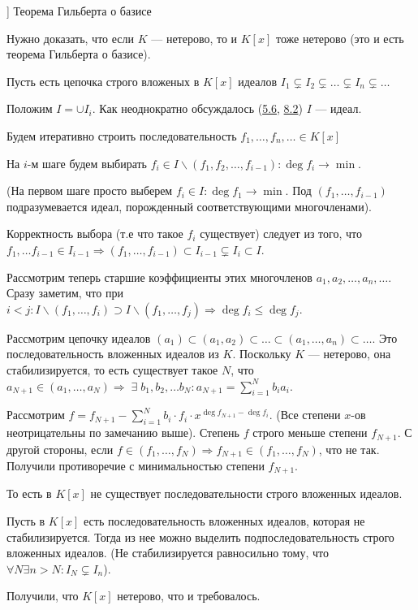 

\date{}



\begin{problem}[10 [Каргальцев]]
Теорема Гильберта о базисе

Нужно доказать, что если $K$ --- нетерово, то и $K[x]$ тоже нетерово (это и есть теорема Гильберта о базисе).
\end{problem}

\begin{solution}
Пусть есть цепочка строго вложеных в \(K[x]\) идеалов \(I_1 \subsetneq I_2 \subsetneq \ldots \subsetneq I_n \subsetneq \ldots\)

Положим \(I = \cup I_i\). Как неоднократно обсуждалось (\hyperlink{5.6}{5.6}, \hyperlink{8.2}{8.2}) \(I\) --- идеал.

Будем итеративно строить последовательность \(f_1, \ldots, f_n, \ldots \in K[x]\)

На \(i\)-м шаге будем выбирать \(f_i \in I \backslash (f_1, f_2, \ldots, f_{i - 1}): \deg f_i \to \min\).

(На первом шаге просто выберем \(f_i \in I: \deg f_1 \to \min\). Под \((f_1, \ldots, f_{i - 1})\) подразумевается идеал, порожденный соответствующими многочленами).

Корректность выбора (т.е что такое \(f_i\) существует) следует из того, что \(f_1, \ldots f_{i - 1} \in I_{i - 1} \Rightarrow (f_1, \ldots, f_{i - 1}) \subset I_{i - 1} \subsetneq I_i \subset I\).

Рассмотрим теперь старшие коэффициенты этих многочленов \(a_1, a_2, \ldots, a_n, \ldots\). Сразу заметим, что при \(i < j: I \backslash (f_1, \ldots, f_i) \supset I \backslash (f_1, \ldots, f_j) \Rightarrow \deg f_i \leqslant \deg f_j\).

Рассмотрим цепочку идеалов \((a_1) \subset (a_1, a_2) \subset \ldots \subset (a_1, \ldots, a_n) \subset \ldots\). Это последовательность вложенных идеалов из \(K\). Поскольку \(K\) --- нетерово, она стабилизируется, то есть существует такое \(N\), что \(a_{N + 1} \in (a_1, \ldots, a_N) \Rightarrow \; \exists \; b_1, b_2, \ldots b_N: a_{N + 1} = \sum\limits_{i = 1}^N b_i a_i\).

Рассмотрим \(f = f_{N + 1} - \sum\limits_{i = 1}^N b_i \cdot f_i \cdot x^{\deg f_{N + 1} - \deg f_i}\). (Все степени \(x\)-ов неотрицательны по замечанию выше). Степень \(f\) строго меньше степени \(f_{N + 1}\). С другой стороны, если \(f \in (f_1, \ldots, f_N) \Rightarrow f_{N + 1} \in (f_1, \ldots, f_N)\), что не так. Получили противоречие с минимальностью степени \(f_{N + 1}\).

То есть в \(K[x]\) не существует последовательности строго вложенных идеалов.

Пусть в \(K[x]\) есть последовательность вложенных идеалов, которая не стабилизируется. Тогда из нее можно выделить подпоследовательность строго вложенных идеалов. (Не стабилизируется равносильно тому, что \(\forall N \exists n > N: I_N \subsetneq I_n\)).

Получили, что \(K[x]\) нетерово, что и требовалось.
\end{solution}


